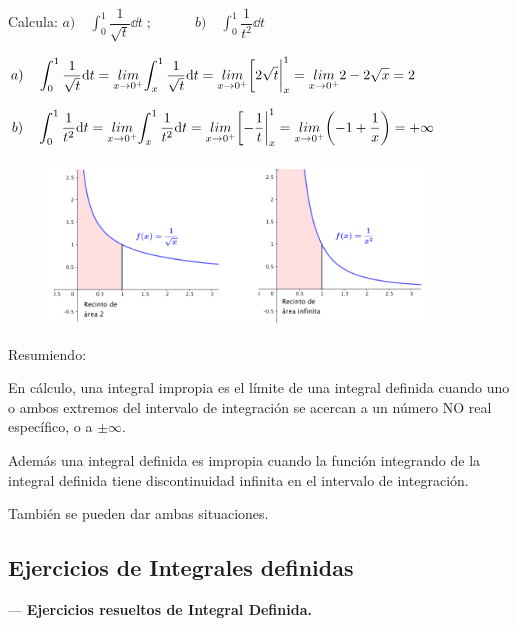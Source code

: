 \begin{ejem}
Calcula: $a) \quad \displaystyle \int_0^1 \dfrac {1}{\sqrt{t}} \dd t\; ; \qquad \quad b) \quad \displaystyle \int_0^1 \dfrac {1} {t^2} \dd t $	

$a) \quad \displaystyle \int_0^1 \dfrac {1}{\sqrt{t}} \dd t= \underset {x\to 0^+}{lim}{\int_x^1 \dfrac {1}{\sqrt{t}} \dd t} =\underset {x\to 0^+}{lim} { \eval[2\sqrt{t}|_x^1 }= \underset {x\to 0^+}{lim} {2-2\sqrt{x}}=2$

$b) \quad  \displaystyle \int_0^1 \dfrac {1} {t^2} \dd t = \underset {x\to 0^+}{lim}{\int_x^1 \dfrac {1}{t^2} \dd t}= \underset {x\to 0^+}{lim} { \eval[-\dfrac 1 t|_x^1 }=\underset {x\to 0^+}{lim} {\left(-1+\dfrac 1 x  \right)}=+\infty$

\begin{figure}[H]
 	\centering
	\includegraphics[width=0.9\textwidth]{imagenes/imagenes08/T08IM11.png}
\end{figure}

\end{ejem}

Resumiendo:

En cálculo, una integral impropia es el límite de una integral definida cuando uno o ambos extremos del intervalo de integración se acercan a un número NO real específico,  o a $\pm \infty$.

Además una integral definida es impropia cuando la función integrando de la integral definida tiene discontinuidad infinita en el intervalo de integración. 

También se pueden dar ambas situaciones.


\subsection{Ejercicios de Integrales definidas}

--- \textbf{Ejercicios resueltos de Integral Definida.}

